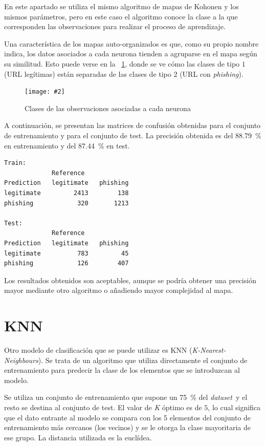 \documentclass[12pt, a4paper]{article}
\renewcommand{\textit}{\textsl}
\newcommand*{\figref}[1]{\figurename~\ref{fig:#1}}
\newcommand{\figcaption}[4][H]{
  \begin{figure}[#1]
    \centering
    \texttt{[image: \#2]}
    \caption{#3}
    \label{fig:#2}
  \end{figure}
}
\newcommand*{\dataset}{\textit{dataset}}
\newcommand*{\phishing}{\textit{phishing}}
\begin{document}
      En este apartado se utiliza el mismo algoritmo de mapas de Kohonen y los mismos parámetros, pero en este caso el algoritmo conoce la clase a la que corresponden las observaciones para realizar el proceso de aprendizaje.

      Una característica de los mapas auto-organizados es que, como su propio nombre indica, los datos asociados a cada neurona tienden a agruparse en el mapa según su similitud. Esto puede verse en la \figref{classes_som.png}, donde se ve cómo las clases de tipo $1$ (URL legítimas) están separadas de las clases de tipo $2$ (URL con \phishing).

      \figcaption{classes_som.png}{Clases de las observaciones asociadas a cada neurona}{1}

      A continuación, se presentan las matrices de confusión obtenidas para el conjunto de entrenamiento y para el conjunto de test. La precisión obtenida es del \SI{88.79}{\percent} en entrenamiento y del \SI{87.44}{\percent} en test.

      \begin{verbatim}
Train:
             Reference
Prediction   legitimate   phishing
legitimate         2413        138
phishing            320       1213

Test:
             Reference
Prediction   legitimate   phishing
legitimate          783         45
phishing            126        407
      \end{verbatim}

      Los resultados obtenidos son aceptables, aunque se podría obtener una precisión mayor mediante otro algoritmo o añadiendo mayor complejidad al mapa.

  \section{KNN}

    Otro modelo de clasificación que se puede utilizar es KNN (\textit{K-Nearest-Neighbours}). Se trata de un algoritmo que utiliza directamente el conjunto de entrenamiento para predecir la clase de los elementos que se introduzcan al modelo.

    Se utiliza un conjunto de entrenamiento que supone un \SI{75}{\percent} del \dataset\ y el resto se destina al conjunto de test. El valor de \textit{K} óptimo es de $5$, lo cual significa que el dato entrante al modelo se compara con los 5 elementos del conjunto de entrenamiento más cercanos (los vecinos) y se le otorga la clase mayoritaria de ese grupo. La distancia utilizada es la euclídea.
\end{document}
